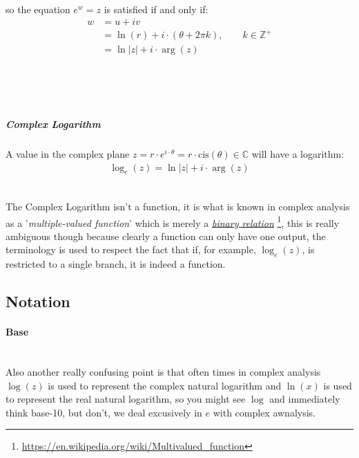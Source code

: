 \documentclass[class=article, crop=false]{standalone}
\begin{document}
so the equation $e^w= z$ is satisfied if and only if:
\begin{align*}
  w &=   u +  iv\\
  &=  \ln{\left( r \right) } +  i \cdot  \left(  \theta +  2\pi k \right) , \qquad k \in \mathbb{Z}^+\\
    &= \ln{\left|      z   \right| } +  i \cdot \operatorname{arg}\left( z \right)
\end{align*}


\ \

\ \

\hfill\begin{minipage}{\dimexpr\textwidth-3cm}
\begin{tcolorbox}

  \subparagraph{Complex Logarithm}
  A value in the complex plane $z= r\cdot e^{i\cdot \theta}=  r\cdot \mathrm{cis}{\left( \theta \right) } \in \mathbb{C} $ will have a logarithm:
\begin{align}
  \log_e{\left( z \right) } = \ln{     \left| z \right| + i\cdot \operatorname{arg}\left( z \right)  } \label{compdef}
\end{align}
\end{tcolorbox}

\end{minipage}
\ \\

The Complex Logarithm isn't a function, it is what is known in complex analysis as a '\textit{multiple-valued function}' which is merely a \href{https://en.wikipedia.org/wiki/Multivalued_function}{\textit{binary relation}} \footnote{\url{https://en.wikipedia.org/wiki/Multivalued_function}}, this is really ambiguous though because clearly a function can only have one output, the terminology is used to respect the fact that if, for example, $\log_e{\left( z \right) }$, is restricted to a single branch, it is indeed a function.
\ \\



\newpage



\subsection{Notation}



    \paragraph{Base}\ \\
    Also another really confusing point is that often times in complex analysis $\operatorname{log}\left( z \right)$ is used to represent the complex natural logarithm and $\ln{\left( x \right) }$ is used to represent the real natural logarithm, so you might see $\operatorname{log}$ and immediately think base-10, but don't, we deal excusively in $e$ with complex awnalysis.\\
\end{document}
